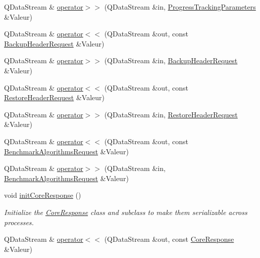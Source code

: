 \begin{DoxyCompactItemize}
\item 
Q\+Data\+Stream \& \hyperlink{namespace_gost_crypt_1_1_core_a69d930dadb4047e39fcc4debbd0c2222}{operator$>$$>$} (Q\+Data\+Stream \&in, \hyperlink{struct_gost_crypt_1_1_core_1_1_progress_tracking_parameters}{Progress\+Tracking\+Parameters} \&Valeur)
\item 
Q\+Data\+Stream \& \hyperlink{namespace_gost_crypt_1_1_core_a1ed9186371e9ce4c0ab9bad297910414}{operator$<$$<$} (Q\+Data\+Stream \&out, const \hyperlink{struct_gost_crypt_1_1_core_1_1_backup_header_request}{Backup\+Header\+Request} \&Valeur)
\item 
Q\+Data\+Stream \& \hyperlink{namespace_gost_crypt_1_1_core_a4023bff4ba5e83aaa44199bfd7977366}{operator$>$$>$} (Q\+Data\+Stream \&in, \hyperlink{struct_gost_crypt_1_1_core_1_1_backup_header_request}{Backup\+Header\+Request} \&Valeur)
\item 
Q\+Data\+Stream \& \hyperlink{namespace_gost_crypt_1_1_core_ad49d1c4727f8e8c331c80dfb55f3a364}{operator$<$$<$} (Q\+Data\+Stream \&out, const \hyperlink{struct_gost_crypt_1_1_core_1_1_restore_header_request}{Restore\+Header\+Request} \&Valeur)
\item 
Q\+Data\+Stream \& \hyperlink{namespace_gost_crypt_1_1_core_a94776731b2ffff13db8244acb780519c}{operator$>$$>$} (Q\+Data\+Stream \&in, \hyperlink{struct_gost_crypt_1_1_core_1_1_restore_header_request}{Restore\+Header\+Request} \&Valeur)
\item 
Q\+Data\+Stream \& \hyperlink{namespace_gost_crypt_1_1_core_aa6a7a985414a591b8cec54ea915c3f5a}{operator$<$$<$} (Q\+Data\+Stream \&out, const \hyperlink{struct_gost_crypt_1_1_core_1_1_benchmark_algorithms_request}{Benchmark\+Algorithms\+Request} \&Valeur)
\item 
Q\+Data\+Stream \& \hyperlink{namespace_gost_crypt_1_1_core_ade26869a62f08c4cc4143dfbbe6fa402}{operator$>$$>$} (Q\+Data\+Stream \&in, \hyperlink{struct_gost_crypt_1_1_core_1_1_benchmark_algorithms_request}{Benchmark\+Algorithms\+Request} \&Valeur)
\item 
void \hyperlink{namespace_gost_crypt_1_1_core_a53ceac5fcd668c0bbf3f58a69f62fef9}{init\+Core\+Response} ()
\begin{DoxyCompactList}\small\item\em Initialize the \hyperlink{struct_gost_crypt_1_1_core_1_1_core_response}{Core\+Response} class and subclass to make them serializable across processes. \end{DoxyCompactList}\item 
Q\+Data\+Stream \& \hyperlink{namespace_gost_crypt_1_1_core_a4a457cd0affe92605f93430290c6e538}{operator$<$$<$} (Q\+Data\+Stream \&out, const \hyperlink{struct_gost_crypt_1_1_core_1_1_core_response}{Core\+Response} \&Valeur)

\end{DoxyCompactItemize}
